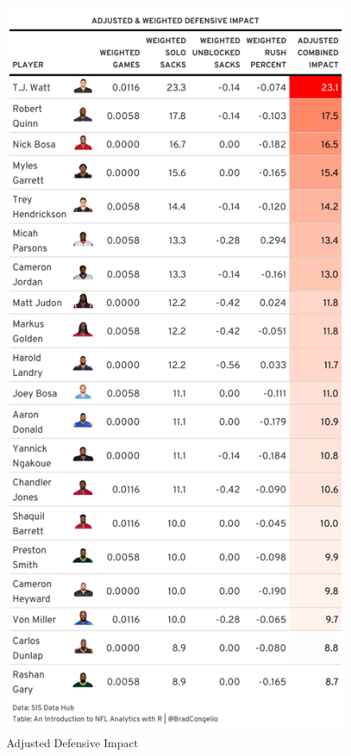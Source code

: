 \documentclass[
  letterpaper,
]{krantz}
\begin{document}
\begin{figure}

{\centering \includegraphics[width=1\textwidth,height=\textheight]{./images/adjusteddefense.png}

}

\caption{Adjusted Defensive Impact}

\end{figure}
\end{document}
